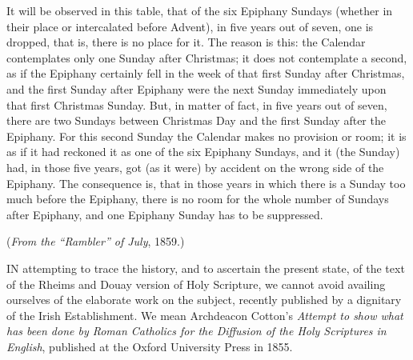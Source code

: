 It will be observed in
this table, that of the six Epiphany Sundays (whether in their place
or intercalated before Advent), in five years out of seven, one is
dropped, that is, there is no place for it. The reason is this: the
Calendar contemplates only one Sunday after Christmas; it does not
contemplate a second, as if the Epiphany certainly fell in the week of
that first Sunday after Christmas, and the first Sunday after Epiphany
were the next Sunday immediately upon that first Christmas Sunday.
But, in matter of fact, in five years out of seven, there are two
Sundays between Christmas Day and the first Sunday after the Epiphany.
For this second Sunday the Calendar makes no provision or room; it is
as if it had reckoned it as one of the six Epiphany Sundays, and it
(the Sunday) had, in those five years, got (as it were) by accident on
the wrong side of the Epiphany. The consequence is, that in those
years in which there is a Sunday too much before the Epiphany, there
is no room for the whole number of Sundays after Epiphany, and one
Epiphany Sunday has to be suppressed.


(\emph{From the ``Rambler'' of July},
1859.)


IN attempting to trace the history, and
to ascertain the present state, of the text of the Rheims and Douay
version of Holy Scripture, we cannot avoid availing ourselves of the
elaborate work on the subject, recently published by a dignitary of
the Irish Establishment. We mean Archdeacon Cotton's \emph{Attempt to
show what has been done by Roman Catholics for the Diffusion of the
Holy Scriptures in English}, published at the Oxford University
Press in 1855.

